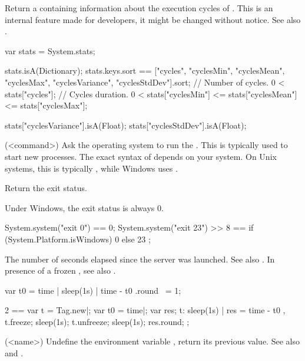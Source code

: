 \begin{urbiscriptapi}
\item[stats]%
  Return a  containing information about the execution
  cycles of \urbi.  This is an internal feature made for developers, it
  might be changed without notice.  See also .
\begin{urbiassert}
var stats = System.stats;

stats.isA(Dictionary);
stats.keys.sort == ["cycles",
                    "cyclesMin", "cyclesMean", "cyclesMax",
                    "cyclesVariance", "cyclesStdDev"].sort;
// Number of cycles.
0 < stats["cycles"];
// Cycles duration.
0 < stats["cyclesMin"] <= stats["cyclesMean"] <= stats["cyclesMax"];

stats["cyclesVariance"].isA(Float);
stats["cyclesStdDev"].isA(Float);
\end{urbiassert}




\item[system](<command>)%
  Ask the operating system to run the .  This is typically used
  to start new processes.  The exact syntax of  depends on your
  system.  On Unix systems, this is typically , while Windows
  uses .

  Return the exit status.

  \begin{windows}
    Under Windows, the exit status is always 0.
  \end{windows}

\begin{urbiassert}
System.system("exit 0") == 0;
System.system("exit 23") >> 8
       == { if (System.Platform.isWindows) 0 else 23 };
\end{urbiassert}


\item[time] The number of seconds elapsed since the \urbi server was
  launched.  See also .  In presence of a frozen
  , see also .
\begin{urbiassert}
{ var t0 = time | sleep(1s) | time - t0 }.round ~= 1;

  2 ==
  {
    var t = Tag.new|;
    var t0 = time|;
    var res;
    t: { sleep(1s) | res = time - t0 },
    t.freeze;
    sleep(1s);
    t.unfreeze;
    sleep(1s);
    res.round;
  };
\end{urbiassert}


\item[unsetenv](<name>)%
  Undefine the environment variable , return its previous value.
  See also  and .


\end{urbiscriptapi}

